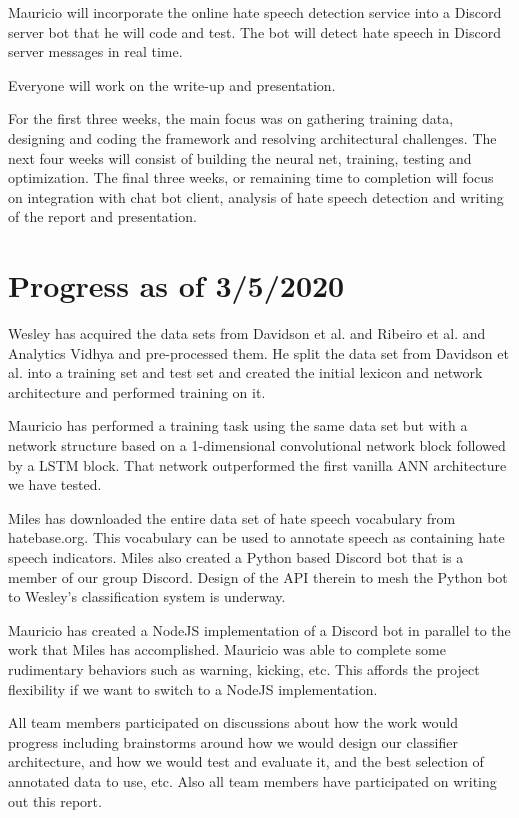 \documentclass[conference]{sig-alternate-05-2015}
\begin{document}
Mauricio will incorporate the online hate speech detection service into a Discord server bot that he will code and test. The bot will detect hate speech in Discord server messages in real time.

Everyone will work on the write-up and presentation.

For the first three weeks, the main focus was on gathering training data, designing and coding the framework and resolving architectural challenges.  The next four weeks will consist of building the neural net, training, testing and optimization.  The final three weeks, or remaining time to completion will focus on integration with chat bot client, analysis of hate speech detection and writing of the report and presentation.

\section{Progress as of 3/5/2020}

Wesley has acquired the data sets from Davidson et al. and Ribeiro et al. and Analytics Vidhya and pre-processed them. He split the data set from Davidson et al. into a training set and test set and created the initial lexicon and network architecture and performed training on it.

Mauricio has performed a training task using the same data set but with a network structure based on a 1-dimensional convolutional network block followed by a LSTM block. That network outperformed the first vanilla ANN architecture we have tested.

Miles has downloaded the entire data set of hate speech vocabulary from hatebase.org.  This vocabulary can be used to annotate speech as containing hate speech indicators.  Miles also created a Python based Discord bot that is a member of our group Discord.  Design of the API therein to mesh the Python bot to Wesley's classification system is underway.

Mauricio has created a NodeJS implementation of a Discord bot in parallel to the work that Miles has accomplished.  Mauricio was able to complete some rudimentary behaviors such as warning, kicking, etc.  This affords the project flexibility if we want to switch to a NodeJS implementation.

All team members participated on discussions about how the work would progress including brainstorms around how we would design our classifier architecture, and how we would test and evaluate it, and the best selection of annotated data to use, etc. Also all team members have participated on writing out this report. 
\end{document}
